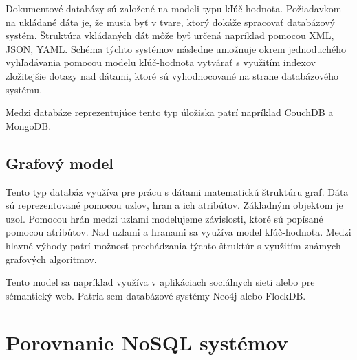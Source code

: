 \documentclass[11pt,twoside,a4paper]{book}
\begin{document}
Dokumentové databázy sú založené na modeli typu kľúč-hodnota. Požiadavkom na ukládané dáta je, že musia byť v tvare, ktorý dokáže spracovať databázový systém. Štruktúra vkládaných dát môže byť určená napríklad pomocou XML, JSON, YAML. Schéma týchto systémov následne umožnuje okrem jednoduchého vyhľadávania pomocou modelu kľúč-hodnota vytvárať s využitím indexov zložitejšie dotazy nad dátami, ktoré sú vyhodnocované na strane databázového systému. 

Medzi databáze reprezentujúce tento typ úložiska patrí napríklad CouchDB a MongoDB.

\subsection{Grafový model}
Tento typ databáz využíva pre prácu s dátami matematickú štruktúru graf. Dáta sú reprezentované pomocou uzlov, hran a ich atribútov. Základným objektom je uzol. Pomocou hrán medzi uzlami modelujeme závislosti, ktoré sú popísané pomocou atribútov. Nad uzlami a hranami sa využíva model kľúč-hodnota. Medzi hlavné výhody patrí možnosť prechádzania týchto štruktúr s využitím známych grafových algoritmov. 

Tento model sa napríklad využíva v aplikáciach sociálnych sieti alebo pre sémantický web. Patria sem databázové systémy Neo4j alebo FlockDB.


\section{Porovnanie NoSQL systémov}


\end{document}
